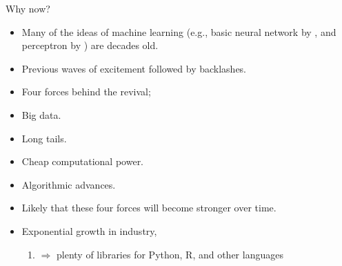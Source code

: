 \documentclass[notes, ignorenonframetext, compress, 10pt, xcolor=svgnames, aspectratio=169]{beamer}
\begin{document}
\begin{frame}
[allowframebreaks]{Why now?}
\begin{itemize}
\item Many of the ideas of machine learning (e.g., basic neural network by \citep{mcculloch43a}, and
perceptron by \citep{Rosenblatt1958ThePA}) are decades old.
\item Previous waves of excitement followed by backlashes.
\item Four forces behind the revival;
\item Big data.
\item Long tails.
\item Cheap computational power.
\item Algorithmic advances.
\item Likely that these four forces will become stronger over time.
\item Exponential growth in industry,
\begin{enumerate}[$\cdot$]
  \item $\Rightarrow$ plenty of libraries for Python, R, and other languages
\end{enumerate}
\end{itemize}
\end{frame}
\end{document}
